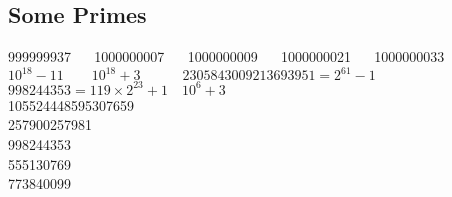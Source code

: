 \subsection{Some Primes}

999999937 $\quad$ 1000000007 $\quad$ 1000000009 $\quad$ 1000000021 $\quad$ 1000000033
$10^{18} - 11 \quad\quad 10^{18} + 3 \quad\quad\quad 2305843009213693951 = 2^{61} - 1$
$998244353 = 119 \times 2^{23} + 1 \quad 10^6+3$\\
105524448595307659   \\
257900257981    \\
998244353     \\
555130769     \\
773840099     \\